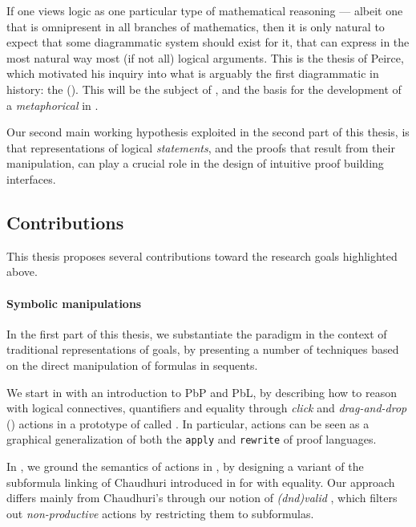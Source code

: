 If one views logic as one particular type of mathematical reasoning --- albeit
one that is omnipresent in all branches of mathematics, then it is only natural
to expect that some diagrammatic system should exist for it, that can express in
the most natural way most (if not all) logical arguments. This is the
\emph{} thesis of Peirce, which motivated his inquiry into what is
arguably the first diagrammatic  in history: the  (). This will be the subject of , and the basis
for the development of a \emph{metaphorical}  in .

\begin{emphpar}
  Our second main working hypothesis exploited in the second part of this
  thesis, is that  representations of logical \emph{statements}, and the
  proofs that result from their manipulation, can play a crucial role in the
  design of intuitive proof building interfaces.
\end{emphpar}

\subsection{Contributions}

This thesis proposes several contributions toward the research goals highlighted
above.

\paragraph{Symbolic manipulations}
  
In the first part of this thesis, we substantiate the  paradigm in the
context of traditional representations of goals, by presenting a number of
techniques based on the direct manipulation of \emph{} formulas in
sequents.

We start in  with an introduction to PbP and PbL, by describing how
to reason with logical connectives, quantifiers and equality through
\emph{click} and \emph{drag-and-drop} () actions in a prototype of
 called . In particular,  actions can be seen as a graphical
generalization of both the \texttt{apply} and \texttt{rewrite}  of
 proof languages.

In , we ground the semantics of  actions in  , by designing a variant of the subformula linking
 of Chaudhuri introduced in \cite{Chaudhuri2013} for 
 with equality. Our approach differs mainly from Chaudhuri's through our
notion of \emph{\kl(dnd){valid} }, which filters out
\emph{non-productive}  actions by restricting them to
\emph{} subformulas.

